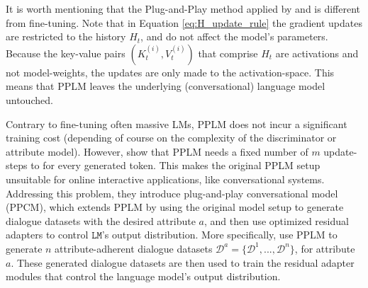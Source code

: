 


It is worth mentioning that the Plug-and-Play method applied by \cite{dathathri2019plug} and \cite{madotto-etal-2020-plug} is different from fine-tuning. Note that in Equation \ref{eq:H_update_rule} the gradient updates are restricted to the history $H_t$, and do not affect the model's parameters. Because the key-value pairs $(K_t^{(i)}, V_t^{(i)})$ that comprise $H_t$ are activations and not model-weights, the updates are only made to the activation-space. This means that PPLM leaves the underlying (conversational) language model untouched.

Contrary to fine-tuning often massive LMs, PPLM does not incur a significant training cost (depending of course on the complexity of the discriminator or attribute model). However, \cite{madotto-etal-2020-plug} show that PPLM needs a fixed number of $m$ update-steps to for every generated token. This makes the original PPLM setup unsuitable for online interactive applications, like conversational systems. Addressing this problem, they introduce plug-and-play conversational model (PPCM), which extends PPLM by using the original model setup to generate dialogue datasets with the desired attribute $a$, and then use optimized residual adapters \citep{bapna-firat-2019-simple} to control $\texttt{LM}$'s output distribution. More specifically, \cite{madotto-etal-2020-plug} use PPLM to generate $n$ attribute-adherent dialogue datasets $\mathscr{D}^a = \{\mathcal{D}^1, ..., \mathcal{D}^n\}$, for attribute $a$. These generated dialogue datasets are then used to train the residual adapter modules that control the language model's output distribution.

